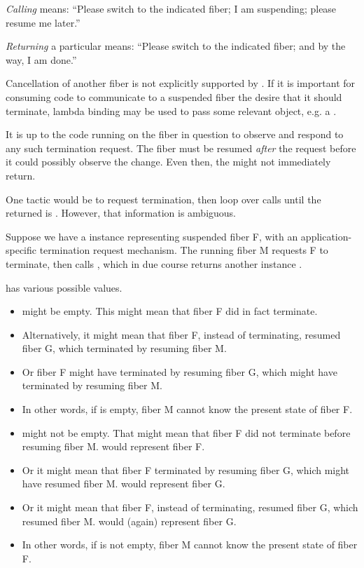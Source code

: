 \emph{Calling} \resume means: ``Please switch to the indicated fiber; I
am suspending; please resume me later.''

\emph{Returning} a particular \fiber means: ``Please switch to the indicated
fiber; and by the way, I am done.''

Cancellation of another fiber is not explicitly supported
by \fiber. If it is important for consuming code to communicate
to a suspended fiber the desire that it should terminate, lambda binding may
be used to pass some relevant object, e.g. a .

It is up to the code running on the fiber in question to observe and respond
to any such termination request. The fiber must be resumed \emph{after} the
request before it could possibly observe the change. Even then, the \entryfn
might not immediately return.

One tactic would be to request termination, then loop over \anyresume calls until
the returned \fiber is \emptyfn. However, that information is ambiguous.

Suppose we have a \fiber instance  representing suspended fiber F,
with an application-specific termination request mechanism. The running fiber
M requests F to terminate, then calls , which in due course
returns another \fiber instance .

 has various possible values.

\begin{itemize}
    \item {} might be empty. This might mean that fiber F did in fact
          terminate.
    \item Alternatively, it might mean that fiber F, instead of terminating,
          resumed fiber G, which terminated by resuming fiber M.
    \item Or fiber F might have terminated by resuming fiber G, which might
          have terminated by resuming fiber M.
    \item In other words, if  is empty, fiber M cannot know the
          present state of fiber F.
    \item {} might not be empty. That might mean that fiber F did not
          terminate before resuming fiber M.  would represent fiber F.
    \item Or it might mean that fiber F terminated by resuming fiber G, which
          might have resumed fiber M.  would represent fiber G.
    \item Or it might mean that fiber F, instead of terminating, resumed fiber
          G, which resumed fiber M.  would (again) represent fiber G.
    \item In other words, if  is not empty, fiber M cannot know the
          present state of fiber F.
\end{itemize}

